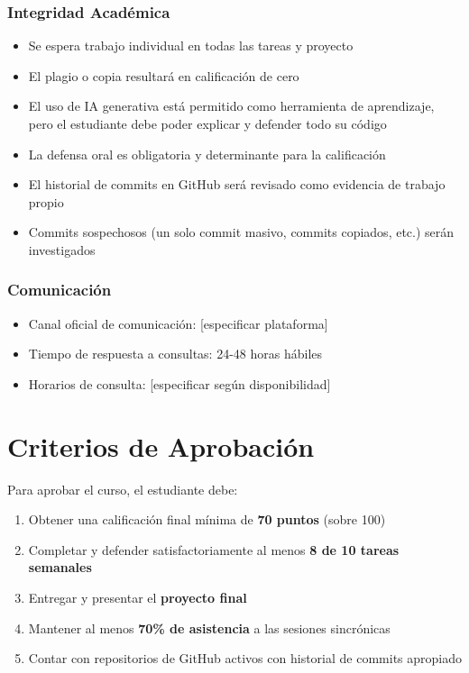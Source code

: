\documentclass[12pt,letterpaper]{article}
\begin{document}
\subsubsection{Integridad Académica}
\begin{itemize}[leftmargin=*]
    \item Se espera trabajo individual en todas las tareas y proyecto
    \item El plagio o copia resultará en calificación de cero
    \item El uso de IA generativa está permitido como herramienta de aprendizaje, pero el estudiante debe poder explicar y defender todo su código
    \item La defensa oral es obligatoria y determinante para la calificación
    \item El historial de commits en GitHub será revisado como evidencia de trabajo propio
    \item Commits sospechosos (un solo commit masivo, commits copiados, etc.) serán investigados
\end{itemize}

\subsubsection{Comunicación}
\begin{itemize}[leftmargin=*]
    \item Canal oficial de comunicación: [especificar plataforma]
    \item Tiempo de respuesta a consultas: 24-48 horas hábiles
    \item Horarios de consulta: [especificar según disponibilidad]
\end{itemize}

\newpage

\section{Criterios de Aprobación}

Para aprobar el curso, el estudiante debe:

\begin{enumerate}[leftmargin=*]
    \item Obtener una calificación final mínima de \textbf{70 puntos} (sobre 100)
    \item Completar y defender satisfactoriamente al menos \textbf{8 de 10 tareas semanales}
    \item Entregar y presentar el \textbf{proyecto final}
    \item Mantener al menos \textbf{70\% de asistencia} a las sesiones sincrónicas
    \item Contar con repositorios de GitHub activos con historial de commits apropiado
\end{enumerate}
\end{document}
